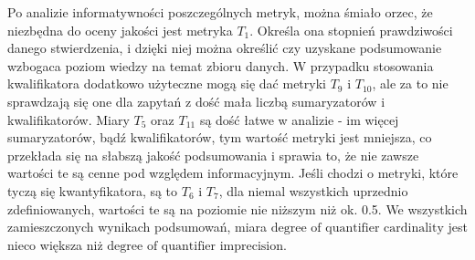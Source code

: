 \documentclass{classrep}
\begin{document}
Po analizie informatywności poszczególnych metryk, można śmiało orzec, że niezbędna do oceny jakości jest metryka \(T_1\). Określa ona stopnień prawdziwości danego stwierdzenia, i dzięki niej można określić czy uzyskane podsumowanie wzbogaca poziom wiedzy na temat zbioru danych. 
W przypadku stosowania kwalifikatora dodatkowo użyteczne mogą się dać metryki \(T_9\) i $T_{\text{10}}$, ale za to nie sprawdzają się one dla zapytań z dość mała liczbą sumaryzatorów i kwalifikatorów. Miary $T_5$ oraz $T_{11}$ są dość łatwe w analizie - im więcej sumaryzatorów, bądź kwalifikatorów, 
tym wartość metryki jest mniejsza, co przekłada się na słabszą jakość podsumowania i sprawia to, że nie zawsze wartości te są cenne pod względem informacyjnym. Jeśli chodzi o metryki, które tyczą się kwantyfikatora, są to $T_6$ i $T_7$, dla niemal wszystkich uprzednio zdefiniowanych, wartości te są na poziomie nie niższym niż ok. 0.5. We wszystkich zamieszczonych wynikach podsumowań, miara \(\text{degree of quantifier cardinality}\) jest nieco większa niż 
\(\text{degree of quantifier imprecision}\).







% 
% 
% 

\end{document}
